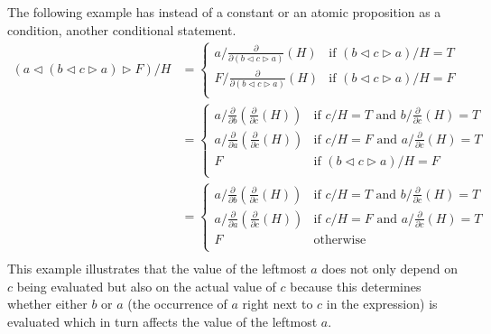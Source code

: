 \documentclass[a4paper,twoside,openright]{report}
\newcommand{\dd}[1]{\frac{\partial}{\partial #1}}
\newcommand{\lef}{\ensuremath{\triangleleft}}
\newcommand{\rig}{\ensuremath{\triangleright}}
\begin{document}
The following example has instead of a constant or an atomic proposition as a condition, another conditional statement.
\begin{align*}
(a\lef(b\lef c\rig a)\rig F)/H
&=\begin{cases}
a/\dd{(b\lef c\rig a)}(H) &\text{if $(b\lef c\rig a)/H=T$}\\
F/\dd{(b\lef c\rig a)}(H) &\text{if $(b\lef c\rig a)/H=F$}\\
\end{cases}\\
&=\begin{cases}
a/\dd b(\dd c(H)) &\text{if $c/H=T$ and $b/\dd c(H)=T$}\\
a/\dd a(\dd c(H)) &\text{if $c/H=F$ and $a/\dd c(H)=T$}\\
F &\text{if $(b\lef c\rig a)/H=F$}\\
\end{cases}\\
&=\begin{cases}
a/\dd b(\dd c(H)) &\text{if $c/H=T$ and $b/\dd c(H)=T$}\\
a/\dd a(\dd c(H)) &\text{if $c/H=F$ and $a/\dd c(H)=T$}\\
F &\text{otherwise}\\
\end{cases}\\
\end{align*}
This example illustrates that the value of the leftmost $a$ does not only depend on $c$ being evaluated but also on the actual value of $c$ because this determines whether either $b$ or $a$ (the occurrence of $a$ right next to $c$ in the expression) is evaluated which in turn affects the value of the leftmost $a$.
\end{document}
